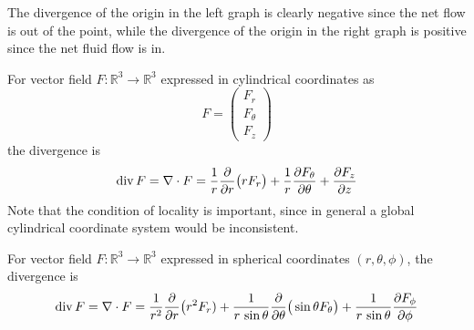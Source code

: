   \begin{example}
  The divergence of the origin in the left graph is clearly negative since the net flow is out of the point, while the divergence of the origin in the right graph is positive since the net fluid flow is in. 

  \begin{center}
  \pgfplotsset{width=7cm,compat=1.16}
  \end{center}
  \end{example}

  \begin{lemma}
  For vector field $F: \mathbb{R}^3 \longrightarrow \mathbb{R}^3$ expressed in cylindrical coordinates as 
  \[F = \begin{pmatrix}
  F_r \\ F_\theta \\ F_z
  \end{pmatrix}\]
  the divergence is
  \[\operatorname{div} F = \nabla \cdot F = \frac{1}{r} \frac{\partial}{\partial r} \big(r F_r \big) + \frac{1}{r} \frac{\partial F_\theta}{\partial \theta} + \frac{\partial F_z}{\partial z}\]
  Note that the condition of locality is important, since in general a global cylindrical coordinate system would be inconsistent. 
  \end{lemma}

  \begin{lemma}
  For vector field $F: \mathbb{R}^3 \longrightarrow \mathbb{R}^3$ expressed in spherical coordinates $(r, \theta, \phi)$, the divergence is 
  \[\operatorname{div} F = \nabla \cdot F = \frac{1}{r^2} \frac{\partial}{\partial r} \big( r^2 F_r) + \frac{1}{r \, \sin{\theta}} \frac{\partial}{\partial \theta} \big( \sin{\theta} F_\theta\big) + \frac{1}{r\, \sin{\theta}} \frac{\partial F_\phi}{\partial \phi}\]
  \end{lemma}

